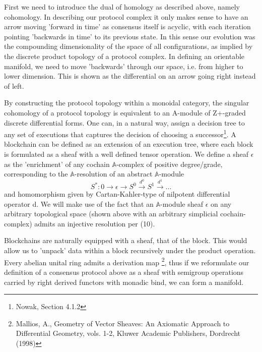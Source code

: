 \documentclass{article}
\begin{document}
First we need to introduce the dual of homology as described above, namely cohomology. In describing our protocol complex it only makes sense to have an arrow moving 'forward in time' as consensus itself is acyclic, with each iteration pointing 'backwards in time' to its previous state. In this sense our evolution was the compounding dimensionality of the space of all configurations, as implied by the discrete product topology of a protocol complex. In defining an orientable manifold, we need to move 'backwards' through our  space, i.e. from higher to lower dimension. This is shown as the differential on an arrow going right instead of left.

By constructing the protocol topology within a monoidal category, the singular cohomology of a protocol topology is equivalent to an A-module of Z+-graded discrete differential forms. One can, in a natural way, assign a decision tree to any set of executions that captures the decision of choosing a successor\footnote{Nowak, Section 4.1.2}. A blockchain can be defined as an extension of an execution tree, where each block is formulated as a sheaf with a well defined tensor operation. We define a sheaf $\epsilon$ as the 'enrichment' of any cochain $\mathbb{A}$-complex of positive degree/grade, corresponding to the $\mathbb{A}$-resolution of an abstract $\mathbb{A}$-module
\begin{equation} \label{eq1}
S^*: 0 \rightarrow \epsilon \rightarrow S^0 \xrightarrow{d^0} S^1 \xrightarrow{d^1} \dots
\end{equation} \label{eq1}
and homomorphism given by  Cartan-Kahler-type of nilpotent differential operator d. We will make use of the fact that an $\mathbb{A}$-module sheaf $\epsilon$ on any arbitrary topological space (shown above with an arbitrary simplicial cochain-complex) admits an injective resolution per (10).

Blockchains are naturally equipped with a sheaf, that of the block.  This would allow us to 'unpack' data within a block recursively under the product operation. Every abelian unital ring admits a derivation map \footnote{Mallios, A., Geometry of Vector Sheaves: An Axiomatic Approach to Differential
Geometry, vols. 1-2, Kluwer Academic Publishers, Dordrecht (1998)}, thus if we reformulate our definition of a consensus protocol above as a sheaf with semigroup operations carried by right derived functors with monadic bind, we can form a manifold.
\end{document}
